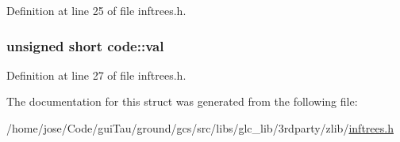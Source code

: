 Definition at line 25 of file inftrees.\-h.

\hypertarget{structcode_a6f9c73627997e8fc6df02e620cf9a6f5}{
\subsubsection[{val}]{\setlength{\rightskip}{0pt plus 5cm}unsigned short code\-::val}}\label{structcode_a6f9c73627997e8fc6df02e620cf9a6f5}


Definition at line 27 of file inftrees.\-h.



The documentation for this struct was generated from the following file\-:\begin{DoxyCompactItemize}
\item 
/home/jose/\-Code/gui\-Tau/ground/gcs/src/libs/glc\-\_\-lib/3rdparty/zlib/\hyperlink{inftrees_8h}{inftrees.\-h}\end{DoxyCompactItemize}
